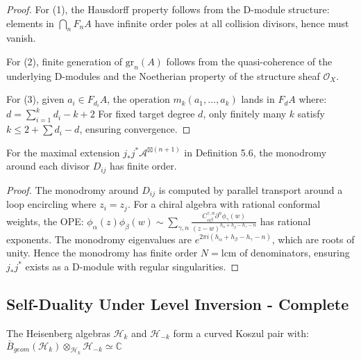 \begin{proof}
For (1), the Hausdorff property follows from the D-module structure: elements in $\bigcap_n F_nA$ have infinite order poles at all collision divisors, hence must vanish.

For (2), finite generation of $\text{gr}_n(A)$ follows from the quasi-coherence of the underlying D-modules and the Noetherian property of the structure sheaf $\mathcal{O}_X$.

For (3), given $a_i \in F_{d_i}A$, the operation $m_k(a_1, \ldots, a_k)$ lands in $F_d A$ where:
$d = \sum_{i=1}^k d_i - k + 2$
For fixed target degree $d$, only finitely many $k$ satisfy $k \leq 2 + \sum d_i - d$, ensuring convergence.
\end{proof}

\begin{theorem}\label{thm:monodromy-finite}
For the maximal extension $j_*j^*\mathcal{A}^{\boxtimes(n+1)}$ in Definition 5.6, the monodromy around each divisor $D_{ij}$ has finite order.
\end{theorem}

\begin{proof}
The monodromy around $D_{ij}$ is computed by parallel transport around a loop encircling where $z_i = z_j$. For a chiral algebra with rational conformal weights, the OPE:
$\phi_\alpha(z)\phi_\beta(w) \sim \sum_{\gamma,n} \frac{C^{\gamma,n}_{\alpha\beta}\partial^n\phi_\gamma(w)}{(z-w)^{h_\alpha + h_\beta - h_\gamma - n}}$
has rational exponents. The monodromy eigenvalues are $e^{2\pi i(h_\alpha + h_\beta - h_\gamma - n)}$, which are roots of unity. Hence the monodromy has finite order $N = \text{lcm}$ of denominators, ensuring $j_*j^*$ exists as a D-module with regular singularities.
\end{proof}

\subsection{Self-Duality Under Level Inversion - Complete}

\begin{theorem}
The Heisenberg algebras $\mathcal{H}_k$ and $\mathcal{H}_{-k}$ form a curved Koszul pair with:
$\bar{B}_{geom}(\mathcal{H}_k) \otimes_{\mathcal{H}_k} \mathcal{H}_{-k} \simeq \mathbb{C}$
\end{theorem}

